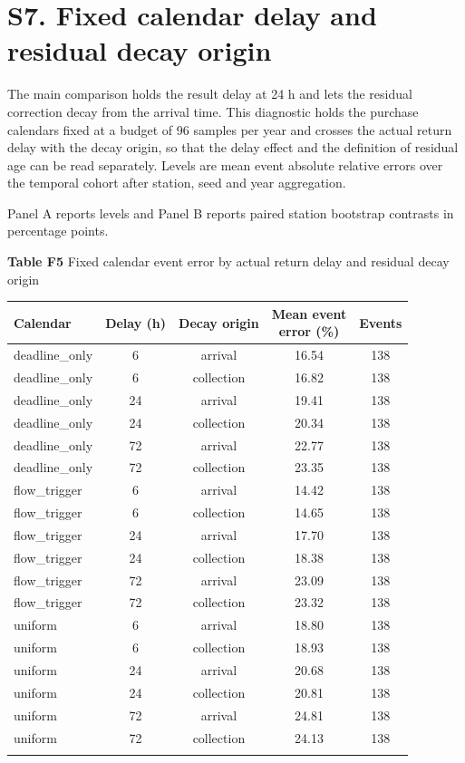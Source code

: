 \documentclass[lineno,pdflatex,sn-apa]{sn-jnl}%
\theoremstyle{thmstyleone}%
\theoremstyle{thmstyletwo}%
\theoremstyle{thmstylethree}%
\begin{document}
\section*{S7. Fixed calendar delay and residual decay origin}

The main comparison holds the result delay at 24 h and lets the residual correction decay from the arrival time. This diagnostic holds the purchase calendars fixed at a budget of 96 samples per year and crosses the actual return delay with the decay origin, so that the delay effect and the definition of residual age can be read separately. Levels are mean event absolute relative errors over the temporal cohort after station, seed and year aggregation.

Panel A reports levels and Panel B reports paired station bootstrap contrasts in percentage points.

\begin{center}
\noindent\textbf{Table F5} Fixed calendar event error by actual return delay and residual decay origin
\end{center}

\begin{center}
\footnotesize
\setlength{\tabcolsep}{2pt}
\begin{tabular}{@{}lcccc@{}}
\toprule
Calendar & Delay (h) & Decay origin & \shortstack{Mean event\\error (\%)} & Events\\
\midrule
deadline\_only & 6 & arrival & 16.54 & 138\\
deadline\_only & 6 & collection & 16.82 & 138\\
deadline\_only & 24 & arrival & 19.41 & 138\\
deadline\_only & 24 & collection & 20.34 & 138\\
deadline\_only & 72 & arrival & 22.77 & 138\\
deadline\_only & 72 & collection & 23.35 & 138\\
flow\_trigger & 6 & arrival & 14.42 & 138\\
flow\_trigger & 6 & collection & 14.65 & 138\\
flow\_trigger & 24 & arrival & 17.70 & 138\\
flow\_trigger & 24 & collection & 18.38 & 138\\
flow\_trigger & 72 & arrival & 23.09 & 138\\
flow\_trigger & 72 & collection & 23.32 & 138\\
uniform & 6 & arrival & 18.80 & 138\\
uniform & 6 & collection & 18.93 & 138\\
uniform & 24 & arrival & 20.68 & 138\\
uniform & 24 & collection & 20.81 & 138\\
uniform & 72 & arrival & 24.81 & 138\\
uniform & 72 & collection & 24.13 & 138\\
\botrule
\end{tabular}
\end{center}
\end{document}
